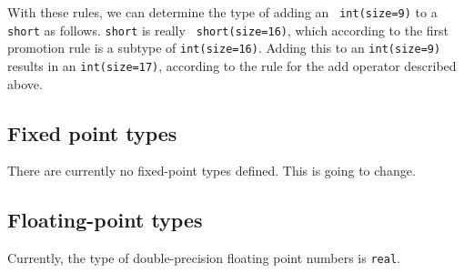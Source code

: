 With these rules, we can determine the type of adding an {\tt
  int(size=9)} to a {\tt short} as follows. {\tt short} is really {\tt
  short(size=16)}, which according to the first promotion rule is a
subtype of {\tt int(size=16)}. Adding this to an {\tt int(size=9)}
results in an {\tt int(size=17)}, according to the rule for the add
operator described above.


\subsection{Fixed point types}

There are currently no fixed-point types defined. This is going to change.

\subsection{Floating-point types}

Currently, the type of double-precision floating point numbers is {\tt real}.







